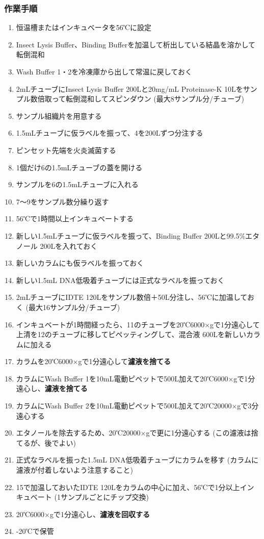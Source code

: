 \documentclass[titlepage,10pt,a4paper,uplatex]{jsbook}
\renewcommand{\textbf}[1]{{\bfseries\sffamily#1}}
\begin{document}
\subsubsection{作業手順}
\begin{enumerate}
\item 恒温槽またはインキュベータを56℃に設定
\item Insect Lysis Buffer、Binding Bufferを加温して析出している結晶を溶かして転倒混和
\item Wash Buffer 1・2を冷凍庫から出して常温に戻しておく
\item 2mLチューブにInsect Lysis Buffer 200{\textmu}Lと20mg/mL Proteinase-K 10{\textmu}Lをサンプル数倍取って転倒混和してスピンダウン (最大8サンプル分/チューブ)
\item サンプル組織片を用意する
\item 1.5mLチューブに仮ラベルを振って、4を200{\textmu}Lずつ分注する
\item ピンセット先端を火炎滅菌する
\item 1個だけ6の1.5mLチューブの蓋を開ける
\item サンプルを6の1.5mLチューブに入れる
\item 7～9をサンプル数分繰り返す
\item 56℃で1時間以上インキュベートする
\item 新しい1.5mLチューブに仮ラベルを振って、Binding Buffer 200{\textmu}Lと99.5\%エタノール 200{\textmu}Lを入れておく
\item 新しいカラムにも仮ラベルを振っておく
\item 新しい1.5mL DNA低吸着チューブには正式なラベルを振っておく
\item 2mLチューブにIDTE 120{\textmu}Lをサンプル数倍＋50{\textmu}L分注し、56℃に加温しておく (最大16サンプル分/チューブ)
\item インキュベートが1時間経ったら、11のチューブを20℃6000×gで1分遠心して上清を12のチューブに移してピペッティングして、混合液 600{\textmu}Lを新しいカラムに加える
\item カラムを20℃6000×gで1分遠心して\textbf{濾液を捨てる}
\item カラムにWash Buffer 1を10mL電動ピペットで500{\textmu}L加えて20℃6000×gで1分遠心し、\textbf{濾液を捨てる}
\item カラムにWash Buffer 2を10mL電動ピペットで500{\textmu}L加えて20℃20000×gで3分遠心する
\item エタノールを除去するため、20℃20000×gで更に1分遠心する (この濾液は捨てるが、後でよい)
\item 正式なラベルを振った1.5mL DNA低吸着チューブにカラムを移す (カラムに濾液が付着しないよう注意すること)
\item 15で加温しておいたIDTE 120{\textmu}Lをカラムの中心に加え、56℃で1分以上インキュベート (1サンプルごとにチップ交換)
\item 20℃6000×gで1分遠心し、\textbf{濾液を回収する}
\item -20℃で保管
\end{enumerate}
\end{document}
